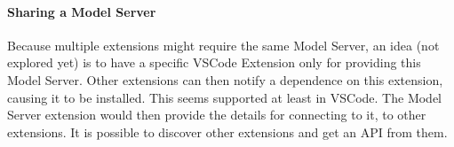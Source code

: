 \paragraph*{Sharing a Model Server}
Because multiple extensions might require the same Model Server, an idea (not explored yet) is to have a specific VSCode Extension only for providing this Model Server.
Other extensions can then notify a dependence on this extension, causing it to be installed.
This seems supported at least in VSCode.
The Model Server extension would then provide the details for connecting to it, to other extensions.
It is possible to discover other extensions and get an \gls{API} from them.


